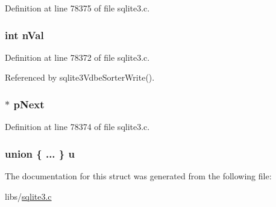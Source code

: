 Definition at line 78375 of file sqlite3.\+c.

\hypertarget{struct_sorter_record_aedf5d5812ebc9169ea4ddf3f5844ba6b}{}
\subsubsection[{n\+Val}]{\setlength{\rightskip}{0pt plus 5cm}int n\+Val}\label{struct_sorter_record_aedf5d5812ebc9169ea4ddf3f5844ba6b}


Definition at line 78372 of file sqlite3.\+c.



Referenced by sqlite3\+Vdbe\+Sorter\+Write().

\hypertarget{struct_sorter_record_a22f9a3bef827a94e99ef770d1d1a3461}{}
\subsubsection[{p\+Next}]{$\ast$ p\+Next}\label{struct_sorter_record_a22f9a3bef827a94e99ef770d1d1a3461}


Definition at line 78374 of file sqlite3.\+c.

\hypertarget{struct_sorter_record_a593e76f03f25f7d7b873858edd561286}{}
\subsubsection[{u}]{\setlength{\rightskip}{0pt plus 5cm}union \{ ... \}   u}\label{struct_sorter_record_a593e76f03f25f7d7b873858edd561286}


The documentation for this struct was generated from the following file\+:\begin{DoxyCompactItemize}
\item 
libs/\hyperlink{sqlite3_8c}{sqlite3.\+c}\end{DoxyCompactItemize}
